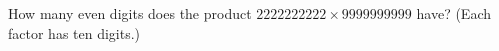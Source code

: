How many even digits does the product $2222222222\times9999999999$ have? (Each factor has ten digits.)
